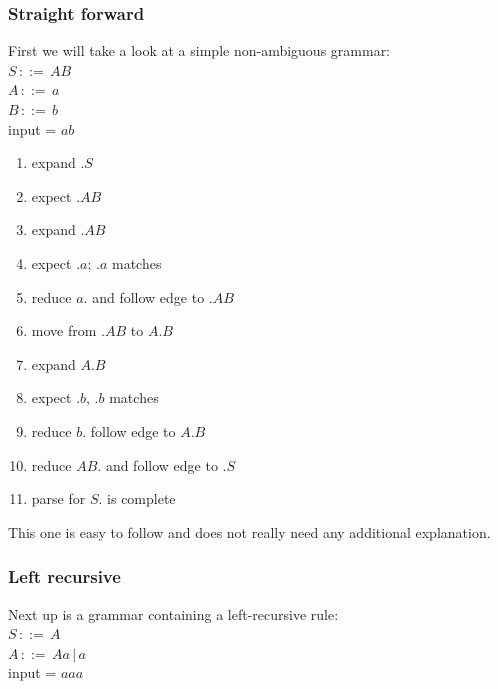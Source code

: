 \documentclass[a4paper,10pt]{article}
\begin{document}
\subsubsection{Straight forward}
First we will take a look at a simple non-ambiguous grammar:\\
$S\,::=\,AB$\\
$A\,::=\,a$\\
$B\,::=\,b$\\
input = $ab$

\begin{enumerate}
 \setlength{\itemsep}{0pt}
 \setlength{\parskip}{0pt}
 \setlength{\parsep}{0pt}
 
 \item expand $.S$
 \item expect $.AB$
 \item expand $.AB$
 \item expect $.a$; $.a$ matches
 \item reduce $a.$ and follow edge to $.AB$
 \item move from $.AB$ to $A.B$
 \item expand $A.B$
 \item expect $.b$, $.b$ matches
 \item reduce $b.$ follow edge to $A.B$
 \item reduce $AB.$ and follow edge to $.S$
 \item parse for $S.$ is complete 
\end{enumerate}
This one is easy to follow and does not really need any additional explanation.

\pagebreak
\subsubsection{Left recursive}
\label{sec:tracesLeftRecusive}
Next up is a grammar containing a left-recursive rule:\\
$S\,::=\,A$\\
$A\,::=\,Aa\,|\,a$\\
input = $aaa$
\end{document}
